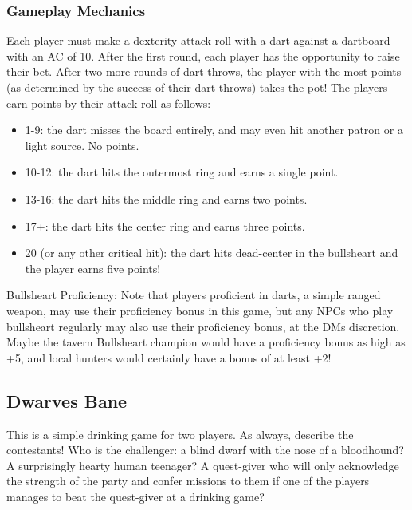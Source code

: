 \documentclass[10pt,a4paper,twoside,twocolumn,openany,nodeprecatedcode]{dndarticle}
\begin{document}
\subsubsection{Gameplay Mechanics}
Each player must make a dexterity attack roll with a dart against a dartboard with an AC of 10. After the first round, each player has the opportunity to raise their bet. After two more rounds of dart throws, the player with the most points (as determined by the success of their dart throws) takes the pot! The players earn points by their attack roll as follows:
\begin{itemize}

\item 1-9: the dart misses the board entirely, and may even hit another patron or a light source. No points.
\item 10-12: the dart hits the outermost ring and earns a single point.
\item 13-16: the dart hits the middle ring and earns two points.
\item 17+: the dart hits the center ring and earns three points.
\item 20 (or any other critical hit): the dart hits dead-center in the bullsheart and the player earns five points!
\end{itemize}


\begin{DndComment}{Bullsheart Proficiency:}
Note that players proficient in darts, a simple ranged weapon, may use their proficiency bonus in this game, but any NPCs who play bullsheart regularly may also use their proficiency bonus, at the DMs discretion. Maybe the tavern Bullsheart champion would have a proficiency bonus as high as +5, and local hunters would certainly have a bonus of at least +2!
\end{DndComment}

\subsection{Dwarves Bane}
This is a simple drinking game for two players. As always, describe the contestants! Who is the challenger: a blind dwarf with the nose of a bloodhound? A surprisingly hearty human teenager? A quest-giver who will only acknowledge the strength of the party and confer missions to them if one of the players manages to beat the quest-giver at a drinking game?
\end{document}
